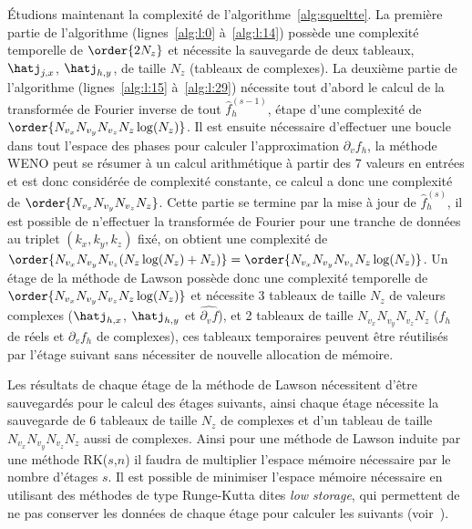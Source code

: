 Étudions maintenant la complexité de l'algorithme~\ref{alg:squeltte}. La première partie de l'algorithme (lignes~\ref{alg:l:0} à~\ref{alg:l:14}) possède une complexité temporelle de $\order{2N_z}$ et nécessite la sauvegarde de deux tableaux, $\hatj_{j,x}$, $\hatj_{h,y}$, de taille $N_z$ (tableaux de complexes). La deuxième partie de l'algorithme (lignes~\ref{alg:l:15} à~\ref{alg:l:29}) nécessite tout d'abord le calcul de la transformée de Fourier inverse de tout $\hat{f}_h^{(s-1)}$, étape d'une complexité de $\order{N_{v_x}N_{v_y}N_{v_z}N_z\log(N_z)}$. Il est ensuite nécessaire d'effectuer une boucle dans tout l'espace des phases pour calculer l'approximation $\partial_vf_h$, la méthode WENO peut se résumer à un calcul arithmétique à partir des 7 valeurs en entrées et est donc considérée de complexité constante, ce calcul a donc une complexité de $\order{N_{v_x}N_{v_y}N_{v_z}N_z}$. Cette partie se termine par la mise à jour de $\hat{f}_h^{(s)}$, il est possible de n'effectuer la transformée de Fourier pour une tranche de données au triplet $(k_x,k_y,k_z)$ fixé, on obtient une complexité de $\order{N_{v_x}N_{v_y}N_{v_z}(N_z\log(N_z)+N_z)} = \order{N_{v_x}N_{v_y}N_{v_z}N_z\log(N_z)}$. Un étage de la méthode de Lawson possède donc une complexité temporelle de $\order{N_{v_x}N_{v_y}N_{v_z}N_z\log(N_z)}$ et nécessite 3 tableaux de taille $N_z$ de valeurs complexes ($\hatj_{h,x}$, $\hatj_{h,y}$ et $\widehat{\partial_vf}$), et 2 tableaux de taille $N_{v_x}N_{v_y}N_{v_z}N_z$ ($f_h$ de réels et $\partial_vf_h$ de complexes), ces tableaux temporaires peuvent être réutilisés par l'étage suivant sans nécessiter de nouvelle allocation de mémoire.

Les résultats de chaque étage de la méthode de Lawson nécessitent d'être sauvegardés pour le calcul des étages suivants, ainsi chaque étage nécessite la sauvegarde de 6 tableaux de taille $N_z$ de complexes et d'un tableau de taille $N_{v_x}N_{v_y}N_{v_z}N_z$ aussi de complexes. Ainsi pour une méthode de Lawson induite par une méthode RK($s$,$n$) il faudra de multiplier l'espace mémoire nécessaire par le nombre d'étages $s$. Il est possible de minimiser l'espace mémoire nécessaire en utilisant des méthodes de type Runge-Kutta dites \emph{low storage}, qui permettent de ne pas conserver les données de chaque étage pour calculer les suivants (voir~\cite{Ketcheson:2015}).

